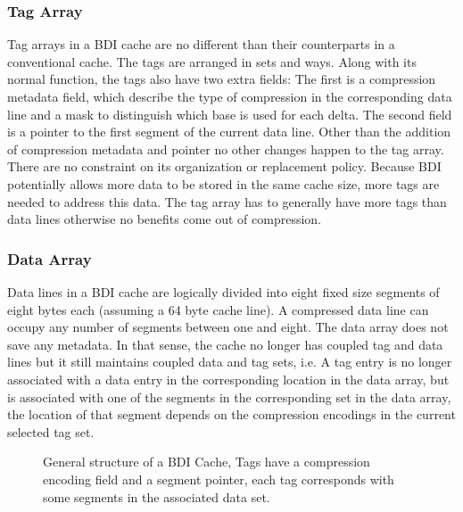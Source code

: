 \subsubsection{Tag Array}
\label{sssec:BDITag}
Tag arrays in a BDI cache are no different than their counterparts in a conventional cache. The tags are arranged in sets and ways. Along with its normal function, the tags also have two extra fields: The first is a compression metadata field, which describe the type of compression in the corresponding data line and a mask to distinguish which base is used for each delta. The second field is a pointer to the first segment of the current data line. Other than the addition of compression metadata and pointer no other changes happen to the tag array. There are no constraint on its organization or replacement policy.
Because BDI potentially allows more data to be stored in the same cache size, more tags are needed to address this data. The tag array has to generally have more tags than data lines otherwise no benefits come out of compression.
\subsubsection{Data Array}
\label{sssec:BDIData}
Data lines in a BDI cache are logically divided into eight fixed size segments of eight bytes each (assuming a 64 byte cache line). A compressed data line can occupy any number of segments between one and eight. The data array does not save any metadata. In that sense, the cache no longer has coupled tag and data lines but it still maintains coupled data and tag sets, i.e. A tag entry is no longer associated with a data entry in the corresponding location in the data array, but is associated with one of the segments in the corresponding set in the data array, the location of that segment depends on the compression encodings in the current selected tag set.
\begin{figure}
    \label{fig:BDI}
    \caption[BDI Cache]{General structure of a BDI Cache, Tags have a compression encoding field and a segment pointer, each tag corresponds with some segments in the associated data set.}
\end{figure}

